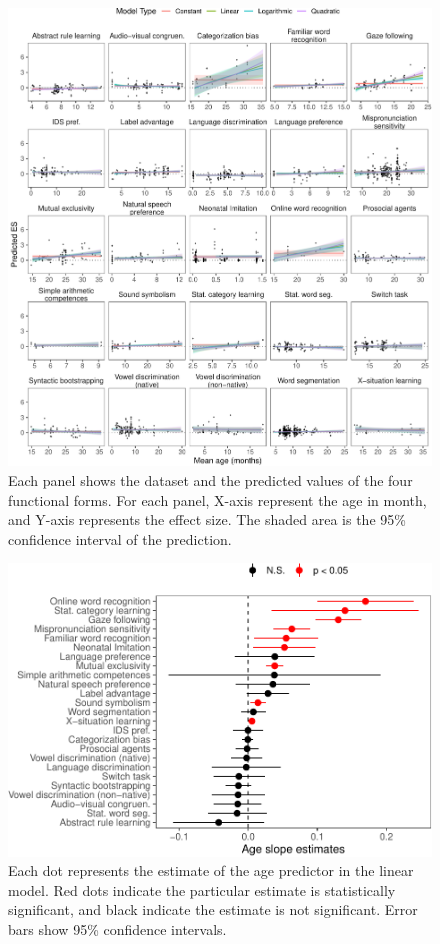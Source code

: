 \documentclass[
  man]{apa6}
\begin{document}
\begin{figure}
\centering
\includegraphics{00_main_files/figure-latex/unnamed-chunk-19-1.pdf}
\caption{\label{fig:unnamed-chunk-19}Each panel shows the dataset and the predicted values of the four functional forms. For each panel, X-axis represent the age in month, and Y-axis represents the effect size. The shaded area is the 95\% confidence interval of the prediction.}
\end{figure}

\begin{figure}
\centering
\includegraphics{00_main_files/figure-latex/unnamed-chunk-20-1.pdf}
\caption{\label{fig:unnamed-chunk-20}Each dot represents the estimate of the age predictor in the linear model. Red dots indicate the particular estimate is statistically significant, and black indicate the estimate is not significant. Error bars show 95\% confidence intervals.}
\end{figure}
\end{document}
